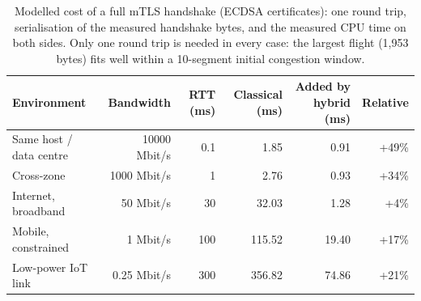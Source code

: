 \begin{table}[t]
\centering
\caption{Modelled cost of a full mTLS handshake (ECDSA certificates): one round trip, serialisation of the measured handshake bytes, and the measured CPU time on both sides. Only one round trip is needed in every case: the largest flight (1,953 bytes) fits well within a 10-segment initial congestion window.}
\label{tab:net}
\small
\setlength{\tabcolsep}{4pt}
\begin{tabular}{lrrrrr}
\toprule
Environment & Bandwidth & RTT (ms) & Classical (ms) & Added by hybrid (ms) & Relative \\
\midrule
Same host / data centre & 10000 Mbit/s & 0.1 & 1.85 & 0.91 & +49\% \\
Cross-zone & 1000 Mbit/s & 1 & 2.76 & 0.93 & +34\% \\
Internet, broadband & 50 Mbit/s & 30 & 32.03 & 1.28 & +4\% \\
Mobile, constrained & 1 Mbit/s & 100 & 115.52 & 19.40 & +17\% \\
Low-power IoT link & 0.25 Mbit/s & 300 & 356.82 & 74.86 & +21\% \\
\bottomrule
\end{tabular}
\end{table}
